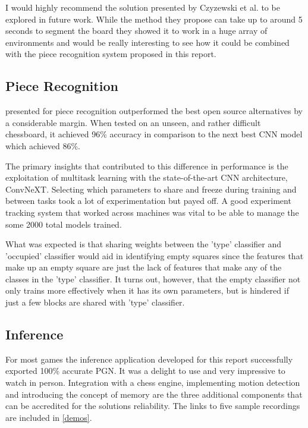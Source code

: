 I would highly recommend the solution presented by Czyzewski et al. \cite{heatmap} to be explored in future work.  While the method they propose can take up to around 5 seconds 
to segment the board they showed it to work in a huge array of environments and would be really interesting to see how it could be combined with the 
piece recognition system proposed in this report.

\subsection{Piece Recognition}
 presented for piece recognition outperformed the best open source alternatives by a considerable margin. 
When tested on an unseen, and rather difficult chessboard, it achieved 96\% accuracy in comparison to the next best CNN model which achieved 86\%.

The primary insights that contributed to this difference in performance is the exploitation of multitask learning with the state-of-the-art 
CNN architecture, ConvNeXT.  Selecting which parameters to share and freeze during training and between tasks took a lot of experimentation but payed off.
A good experiment tracking system that worked across machines was vital to be able to manage the some 2000 total models trained. 

What was expected is that sharing weights between 
the 'type' classifier and 'occupied' classifier would aid in identifying empty squares since the features that make up an empty square are just the lack of 
features that make any of the classes in the 'type' classifier.  It turns out, however, that the empty classifier not only trains more effectively when it has its own 
parameters, but is hindered if just a few blocks are shared with 'type' classifier. 

\subsection{Inference}
For most games the inference application developed for this report successfully exported 100\% accurate PGN.  It was a delight to use and very impressive to 
watch in person.  Integration with a chess engine, implementing motion detection and introducing the concept of memory are the three additional components 
that can be accredited for the solutions reliability.  The links to five sample recordings are included in \autoref{demos}.

